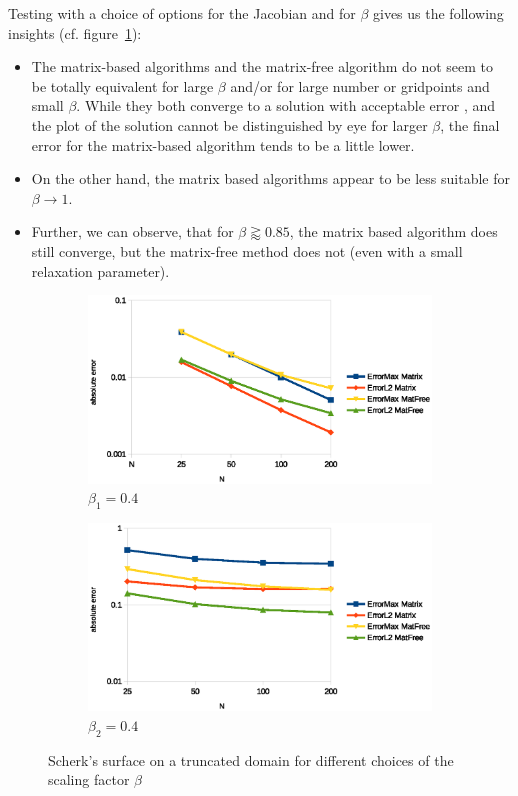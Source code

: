 \documentclass[11pt]{scrartcl}
\begin{document}
Testing with a choice of options for the Jacobian and for $\beta$ gives us the following insights (cf. figure~\ref{fig:conscherks}):
\begin{itemize}
	\item The matrix-based algorithms and the matrix-free algorithm do not seem to be totally equivalent for large $\beta$ and/or for large number or gridpoints and small $\beta$. While they both converge to a solution with acceptable error , and the plot of the solution cannot be distinguished by eye for larger $\beta$, the final error for the matrix-based algorithm tends to be a little lower. 
	\item On the other hand, the matrix based algorithms appear to be less suitable for $\beta\to1$.
	\item Further, we can observe, that for $\beta\gtrapprox0.85$, the matrix based algorithm does still converge, but the matrix-free method does not (even with a small relaxation parameter).
\end{itemize}


\begin{figure}[h!]
	\centering
	\begin{subfigure}{.6\linewidth}
		\includegraphics[width=\linewidth]{figs/errorbeta4}
		\caption{$\beta_1=0.4$}
	\end{subfigure}
	\begin{subfigure}{.6\linewidth}
		\includegraphics[width=\linewidth]{figs/errorbeta8}
		\caption{$\beta_2=0.4$}
	\end{subfigure}
	\caption{Scherk's surface on a truncated domain for different choices of the scaling factor $\beta$}\label{fig:conscherks}
\end{figure}
\end{document}
